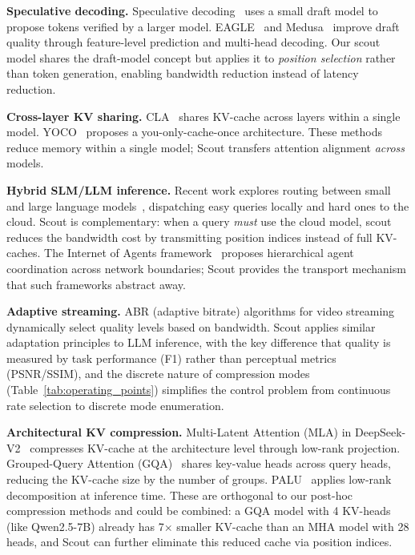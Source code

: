 \documentclass[journal]{IEEEtran}
\begin{document}
\textbf{Speculative decoding.}
Speculative decoding~\cite{speculativedecoding} uses a small draft model to propose tokens verified by a larger model.
EAGLE~\cite{eagle} and Medusa~\cite{medusa} improve draft quality through feature-level prediction and multi-head decoding.
Our scout model shares the draft-model concept but applies it to \emph{position selection} rather than token generation, enabling bandwidth reduction instead of latency reduction.

\textbf{Cross-layer KV sharing.}
CLA~\cite{cla} shares KV-cache across layers within a single model.
YOCO~\cite{yoco} proposes a you-only-cache-once architecture.
These methods reduce memory within a single model; Scout transfers attention alignment \emph{across} models.

\textbf{Hybrid SLM/LLM inference.}
Recent work explores routing between small and large language models~\cite{hybridslm}, dispatching easy queries locally and hard ones to the cloud.
Scout is complementary: when a query \emph{must} use the cloud model, scout reduces the bandwidth cost by transmitting position indices instead of full KV-caches.
The Internet of Agents framework~\cite{ioa} proposes hierarchical agent coordination across network boundaries; Scout provides the transport mechanism that such frameworks abstract away.

\textbf{Adaptive streaming.}
ABR (adaptive bitrate) algorithms for video streaming~\cite{abr} dynamically select quality levels based on bandwidth.
Scout applies similar adaptation principles to LLM inference, with the key difference that quality is measured by task performance (F1) rather than perceptual metrics (PSNR/SSIM), and the discrete nature of compression modes (Table~\ref{tab:operating_points}) simplifies the control problem from continuous rate selection to discrete mode enumeration.

\textbf{Architectural KV compression.}
Multi-Latent Attention (MLA) in DeepSeek-V2~\cite{deepseek} compresses KV-cache at the architecture level through low-rank projection.
Grouped-Query Attention (GQA)~\cite{gqa} shares key-value heads across query heads, reducing the KV-cache size by the number of groups.
PALU~\cite{palu} applies low-rank decomposition at inference time.
These are orthogonal to our post-hoc compression methods and could be combined: a GQA model with 4 KV-heads (like Qwen2.5-7B) already has 7$\times$ smaller KV-cache than an MHA model with 28 heads, and Scout can further eliminate this reduced cache via position indices.
\end{document}
